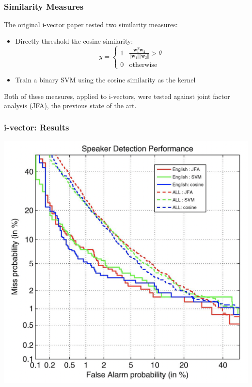 \documentclass{beamer}
\begin{document}
\begin{frame}
  \frametitle{Similarity Measures}

  The original i-vector paper tested two similarity measures:
  \begin{itemize}
  \item Directly threshold the cosine similarity:
    \begin{displaymath}
      y = \begin{cases}
        1 & \frac{\bm{w}_1^T\bm{w}_2}{\Vert\bm{w}_1\Vert\Vert\bm{w}_2\Vert}>\theta\\
        0 & \text{otherwise}
      \end{cases}
    \end{displaymath}
  \item Train a binary SVM using the cosine similarity as the kernel
  \end{itemize}
  Both of these measures, applied to i-vectors, were tested against
  joint factor analysis (JFA), the previous state of the art.
\end{frame}

\begin{frame}
  \frametitle{i-vector: Results}
  \centerline{\includegraphics[height=0.8\textheight]{figs/dehak2011fig6.png}}
\end{frame}

\end{document}
